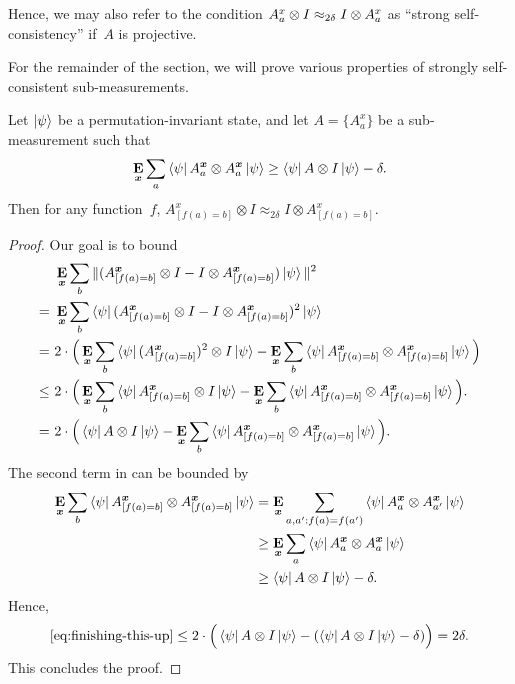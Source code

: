 Hence, we may also refer to the condition $A^x_a \otimes I \approx_{2\delta} I \otimes A^x_a$
as ``strong self-consistency'' if~$A$ is projective.

For the remainder of the section, we will prove various properties of strongly self-consistent sub-measurements.

\begin{proposition}\label{prop:two-notions-of-self-consistency-after-evaluation}
Let $\ket{\psi}$ be a permutation-invariant state,
and let $A = \{A^x_a\}$ be a sub-measurement such that
\begin{equation*}
\mathop{\bf E\/}_{{\boldsymbol{x}}} \sum_a \bra{\psi} A^{{\boldsymbol{x}}}_a \otimes A^{{\boldsymbol{x}}}_a \ket{\psi} \geq  \bra{\psi} A \otimes I \ket{\psi} - \delta.
\end{equation*}
Then for any function~$f$,
$A^x_{[f(a)=b]} \otimes I \approx_{2\delta} I \otimes A^x_{[f(a)=b]}$.
\end{proposition}
\begin{proof}
Our goal is to bound
\begin{align}
&\mathop{\bf E\/}_{{\boldsymbol{x}}} \sum_b \Vert(A^{{\boldsymbol{x}}}_{[f(a)=b]} \otimes I - I \otimes A^{{\boldsymbol{x}}}_{[f(a)=b]}) \ket{\psi}\Vert^2\nonumber\\
=~&\mathop{\bf E\/}_{{\boldsymbol{x}}} \sum_b \bra{\psi} (A^{{\boldsymbol{x}}}_{[f(a)=b]} \otimes I - I \otimes A^{{\boldsymbol{x}}}_{[f(a)=b]})^2 \ket{\psi}\nonumber\\
=~&2\cdot \Big( \mathop{\bf E\/}_{{\boldsymbol{x}}} \sum_b \bra{\psi} (A^{{\boldsymbol{x}}}_{[f(a)=b]})^2 \otimes I \ket{\psi} -  \mathop{\bf E\/}_{{\boldsymbol{x}}} \sum_b \bra{\psi} A^{{\boldsymbol{x}}}_{[f(a)=b]} \otimes A^{{\boldsymbol{x}}}_{[f(a)=b]} \ket{\psi}\Big)\nonumber\\
\leq~&2\cdot \Big( \mathop{\bf E\/}_{{\boldsymbol{x}}} \sum_b \bra{\psi} A^{{\boldsymbol{x}}}_{[f(a)=b]} \otimes I \ket{\psi} -  \mathop{\bf E\/}_{{\boldsymbol{x}}} \sum_b \bra{\psi} A^{{\boldsymbol{x}}}_{[f(a)=b]} \otimes A^{{\boldsymbol{x}}}_{[f(a)=b]} \ket{\psi}\Big).\nonumber\\
=~&2\cdot \Big(  \bra{\psi} A \otimes I \ket{\psi} -  \mathop{\bf E\/}_{{\boldsymbol{x}}} \sum_b \bra{\psi} A^{{\boldsymbol{x}}}_{[f(a)=b]} \otimes A^{{\boldsymbol{x}}}_{[f(a)=b]} \ket{\psi}\Big).\label{eq:finishing-this-up}
\end{align}
The second term in  can be bounded by
\begin{align*}
 \mathop{\bf E\/}_{{\boldsymbol{x}}} \sum_b \bra{\psi} A^{{\boldsymbol{x}}}_{[f(a)=b]} \otimes A^{{\boldsymbol{x}}}_{[f(a)=b]} \ket{\psi}
 &=  \mathop{\bf E\/}_{{\boldsymbol{x}}} \sum_{a, a': f(a) = f(a')} \bra{\psi} A^{{\boldsymbol{x}}}_{a} \otimes A^{{\boldsymbol{x}}}_{a'} \ket{\psi}\\
 &\geq\mathop{\bf E\/}_{{\boldsymbol{x}}} \sum_{a} \bra{\psi} A^{{\boldsymbol{x}}}_{a} \otimes A^{{\boldsymbol{x}}}_{a} \ket{\psi}\\
 &\geq \bra{\psi} A \otimes I \ket{\psi} -\delta.
\end{align*}
Hence,
\begin{equation*}
\eqref{eq:finishing-this-up} \leq 
	2\cdot \Big( \bra{\psi} A \otimes I \ket{\psi} - (\bra{\psi} A \otimes I \ket{\psi} -\delta)\Big)
= 2\delta.
\end{equation*}
This concludes the proof.
\end{proof}




